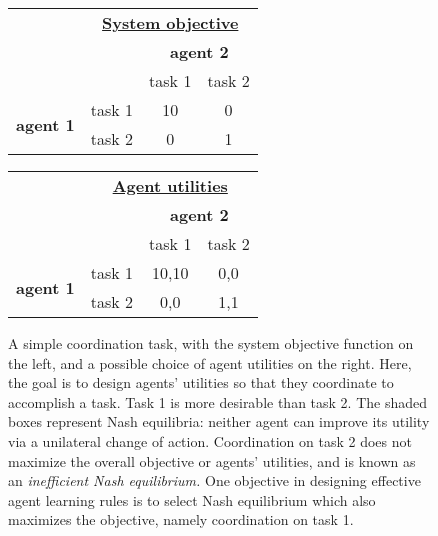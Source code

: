 \begin{example}
\begin{figure}
\begin{center}
\begin{tabular}{rr|c|c|}
\multicolumn{1}{c}{}&\multicolumn{3}{c}{\textbf{\underline{System objective}}}\\
\multicolumn{2}{r}{}&\multicolumn{2}{c}{\textbf{agent 2}}\\
\multicolumn{2}{r}{}
 &  \multicolumn{1}{c}{task 1}
 & \multicolumn{1}{c}{task 2} \\
\cline{3-4}
\multirow{2}{*}{\textbf{agent 1}}
&task 1 & 10 & 0 \\
\cline{3-4}
&task 2 & 0 & 1 \\
\cline{3-4}
\end{tabular}\quad\quad\quad
\begin{tabular}{rr|c|c|}
\multicolumn{1}{c}{}&\multicolumn{3}{c}{\textbf{\underline{Agent utilities}}}\\
\multicolumn{2}{r}{}&\multicolumn{2}{c}{\textbf{agent 2}}\\
\multicolumn{2}{r}{}
 &  \multicolumn{1}{c}{task 1}
 & \multicolumn{1}{c}{task 2} \\
\cline{3-4}
\multirow{2}{*}{\textbf{agent 1}}
&task 1 & \cellcolor[gray]{0.8}10,10 & 0,0 \\
\cline{3-4}
&task 2 & 0,0 & \cellcolor[gray]{0.8}1,1 \\
\cline{3-4}
\end{tabular}
\end{center}
\caption{A simple coordination task, with the system objective function on the left, and a possible choice of agent utilities on the right. Here, the goal is to design agents' utilities so that they coordinate to accomplish a task. Task 1 is more desirable than task 2. The shaded boxes represent Nash equilibria: neither agent can improve its utility via a unilateral change of action. Coordination on task 2 does not maximize the overall objective or agents' utilities, and is known as an {\it inefficient Nash equilibrium.} One objective in designing effective agent learning rules is to select Nash equilibrium which also maximizes the objective, namely coordination on task 1.}
\label{t:simple coordination}
\end{figure}

\FloatBarrier
\end{example}




